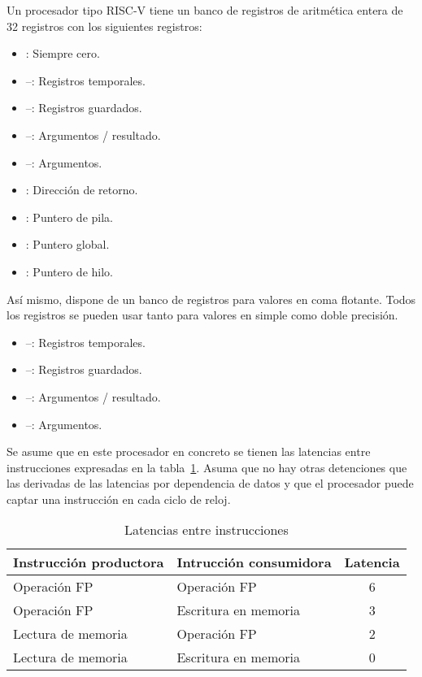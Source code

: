 \begin{acexercise}\end{acexercise}

Un procesador tipo RISC-V tiene un banco de registros de aritmética entera 
de 32 registros con los siguientes registros:

\begin{itemize}
  \item {}: Siempre cero.
  \item {}--: Registros temporales.
  \item {}--: Registros guardados.
  \item {}--: Argumentos / resultado.
  \item {}--: Argumentos.
  \item {}: Dirección de retorno.
  \item {}: Puntero de pila.
  \item {}: Puntero global.
  \item {}: Puntero de hilo.
\end{itemize}

Así mismo, dispone de un banco de registros para valores en coma flotante. Todos los registros
se pueden usar tanto para valores en simple como doble precisión.

\begin{itemize}
  \item {}--: Registros temporales.
  \item {}--: Registros guardados.
  \item {}--: Argumentos / resultado.
  \item {}--: Argumentos.
\end{itemize}

Se asume que en este procesador en concreto se tienen las latencias entre instrucciones
expresadas en la tabla~\ref{tab:unroll-1:latencies}. Asuma que no hay otras detenciones
que las derivadas de las latencias por dependencia de datos y que el procesador puede
captar una instrucción en cada ciclo de reloj.

\begin{table}[htb]
\begin{tabular}{|l|l|c|}
\hline
\textbf{Instrucción productora} &
\textbf{Intrucción consumidora} &
\textbf{Latencia}
\\
\hline

Operación FP & Operación FP & 6\\
\hline

Operación FP & Escritura en memoria & 3\\
\hline

Lectura de memoria & Operación FP & 2\\
\hline

Lectura de memoria & Escritura en memoria & 0\\
\hline

\end{tabular}
\caption{Latencias entre instrucciones}
\label{tab:unroll-1:latencies}
\end{table}


